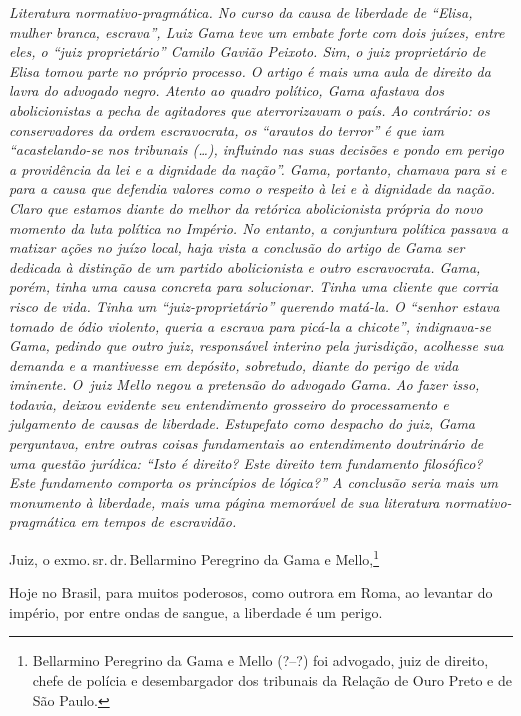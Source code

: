 \begin{resumo}
\emph{Literatura normativo-pragmática. No curso da causa de liberdade de
``Elisa, mulher branca, escrava'', Luiz Gama teve um embate forte com
dois juízes, entre eles, o ``juiz proprietário'' Camilo Gavião Peixoto.
Sim, o juiz proprietário de Elisa tomou parte no próprio processo. O
artigo é mais uma aula de direito da lavra do advogado negro. Atento ao
quadro político, Gama afastava dos abolicionistas a pecha de agitadores
que aterrorizavam o país. Ao contrário: os conservadores da ordem
escravocrata, os ``arautos do terror'' é que iam ``acastelando-se nos
tribunais (\ldots{}), influindo nas suas decisões e pondo em perigo a
providência da lei e a dignidade da nação''. Gama, portanto, chamava para
si e para a causa que defendia valores como o respeito à lei e à
dignidade da nação. Claro que estamos diante do melhor da retórica
abolicionista própria do novo momento da luta política no Império. No
entanto, a conjuntura política passava a matizar ações no juízo local,
haja vista a conclusão do artigo de Gama ser dedicada à distinção de um
partido abolicionista e outro escravocrata. Gama, porém, tinha uma causa
concreta para solucionar. Tinha uma cliente que corria risco de vida.
Tinha um ``juiz-proprietário'' querendo matá-la. O ``senhor estava tomado
de ódio violento, queria a escrava para picá-la a chicote'', indignava-se
Gama, pedindo que outro juiz, responsável interino pela jurisdição,
acolhesse sua demanda e a mantivesse em depósito, sobretudo, diante do
perigo de vida iminente. O~juiz Mello negou a pretensão do advogado
Gama. Ao fazer isso, todavia, deixou evidente seu entendimento grosseiro
do processamento e julgamento de causas de liberdade. Estupefato como
despacho do juiz, Gama perguntava, entre outras coisas fundamentais ao
entendimento doutrinário de uma questão jurídica: ``Isto é direito? Este
direito tem fundamento filosófico? Este fundamento comporta os
princípios de lógica?'' A conclusão seria mais um monumento à liberdade,
mais uma página memorável de sua literatura normativo-pragmática em
tempos de escravidão.}
\end{resumo}

Juiz, o exmo.\,sr.\,dr.\,Bellarmino Peregrino da Gama e
Mello,\footnote{Bellarmino Peregrino da Gama e Mello (?--?) foi \label{bellarmino}
  advogado, juiz de direito, chefe de polícia e desembargador dos
  tribunais da Relação de Ouro Preto e de São Paulo.}

Hoje no Brasil, para muitos poderosos, como outrora em Roma, ao levantar
do império, por entre ondas de sangue, a liberdade é um perigo.

